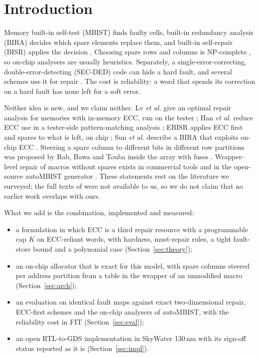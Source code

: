 \documentclass[conference]{IEEEtran}
\begin{document}
\section{Introduction}
Memory built-in self-test (MBIST) finds faulty cells, built-in redundancy analysis (BIRA) decides
which spare elements replace them, and built-in self-repair (BISR) applies the decision
\cite{huang2003,kawagoe2000}. Choosing spare rows and columns is NP-complete \cite{kuo1987}, so
on-chip analysers are usually heuristics. Separately, a single-error-correcting, double-error-detecting
(SEC-DED) code \cite{hsiao1970} can hide a hard fault, and several schemes use it for repair
\cite{lu2016,sun2011,lv2021,han2021}. The cost is reliability: a word that spends its correction on a
hard fault has none left for a soft error.

Neither idea is new, and we claim neither. Lv \emph{et al.} give an optimal repair analysis for
memories with in-memory ECC, run on the tester \cite{lv2021}; Han \emph{et al.} reduce ECC use in a
tester-side pattern-matching analysis \cite{han2021}; EBISR applies ECC first and spares to what is
left, on chip \cite{lu2016}; Sun \emph{et al.} describe a BIRA that exploits on-chip ECC
\cite{sun2011}. Steering a spare column to different bits in different row partitions was proposed by
Rab, Bawa and Touba inside the array with fuses \cite{rab2009}. Wrapper-level repair of macros without
spares exists in commercial tools and in the open-source autoMBIST generator \cite{automb}. These
statements rest on the literature we surveyed; the full texts of \cite{lv2021,lu2016,han2021} were not
available to us, so we do not claim that no earlier work overlaps with ours.

What we add is the combination, implemented and measured:
\begin{itemize}
\item a formulation in which ECC is a third repair resource with a programmable cap $K$ on
ECC-reliant words, with hardness, must-repair rules, a tight fault-store bound and a polynomial case
(Section~\ref{sec:theory});
\item an on-chip allocator that is exact for this model, with spare columns steered per address
partition from a table in the wrapper of an unmodified macro (Section~\ref{sec:arch});
\item an evaluation on identical fault maps against exact two-dimensional repair, ECC-first schemes
and the on-chip analysers of autoMBIST, with the reliability cost in FIT (Section~\ref{sec:eval});
\item an open RTL-to-GDS implementation in SkyWater 130\,nm with its sign-off status reported as it
is (Section~\ref{sec:impl}).
\end{itemize}
\end{document}

